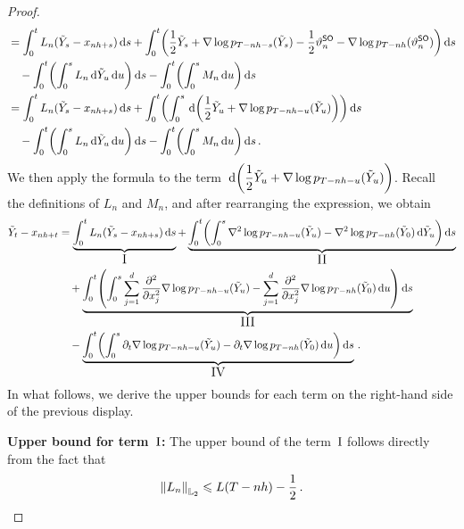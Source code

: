 \begin{proof}
\begin{align*}
&=\int_0^tL_n(\tilde Y_s-x_{nh+s})\rmd s+\int_0^t\left(\dfrac{1}{2}\tilde Y_s+\nabla\log p_{T-nh-s}(\tilde Y_s)-\dfrac{1}{2}\vartheta_n^{\sf SO}-\nabla\log p_{T-nh}(\vartheta_n^{\sf SO})\right)\rmd s\\
&\quad -\int_0^t\left(\int_0^s L_n\rmd \tilde Y_u\rmd u\right)\rmd s-\int_0^t\left(\int_0^s M_n\rmd u\right)\rmd s\\
&=\int_0^t L_n(\tilde Y_s-x_{nh+s})\rmd s+\int_0^t\left(\int_0^s\rmd\left(\dfrac{1}{2}\tilde Y_u+\nabla\log p_{T-nh-u}(\tilde Y_u)\right)\right)\rmd s\\
&\quad -\int_0^t\left(\int_0^s L_n\rmd \tilde Y_u\rmd u\right)\rmd s-\int_0^t\left(\int_0^s M_n\rmd u\right)\rmd s\,.
\end{align*}
We then apply the  formula to the term $\rmd\left(\dfrac{1}{2}\tilde Y_u+\nabla\log p_{T-nh-u}(\tilde Y_u)\right)$. Recall the definitions of $L_n$ and $M_n$, and after rearranging the expression, we obtain
\begin{align*}
\tilde Y_t-x_{nh+t}&=\underbrace{\int_0^tL_n(\tilde{Y}_s-x_{nh+s})\rmd s}_{\text{\large I}}
+\underbrace{\int_0^t\left(\int_0^s\nabla^2\log p_{T-nh-u}(\tilde{Y}_u)-\nabla^2\log p_{T-nh}(\tilde{Y}_0)\rmd\tilde{Y}_u\right)\rmd s}_{\text{\large II}}\\
&\quad +\underbrace{\int_0^t\left(\int_0^s\sum_{j=1}^d\dfrac{\partial^2}{\partial x_j^2}\nabla\log p_{T-nh-u}(\tilde{Y}_u)-\sum_{j=1}^d\dfrac{\partial^2}{\partial x_j^2}\nabla\log p_{T-nh}(\tilde{Y}_0)\rmd u\right)\rmd s}_{\text{\large III}}\\
&\quad -\underbrace{\int_0^t\left(\int_0^s\partial_t\nabla\log p_{T-nh-u}(\tilde{Y}_u)-\partial_t\nabla\log p_{T-nh}(\tilde{Y}_0)\rmd u\right)\rmd s}_{\text{\large IV}}\,.
\end{align*}
In what follows, we derive the upper bounds for each term on the right-hand side of the previous display. 

\noindent \textbf{Upper bound for term~$\rm I$:}
The upper bound of the term~$\rm I$ follows directly from the fact that 
\begin{align*}
\l|L_n\r|_{\Ltwo}\leqslant L(T-nh)-\dfrac{1}{2}\,.
\end{align*}


\end{proof}
